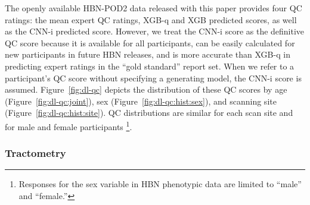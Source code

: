 \documentclass[fleqn,10pt,inline]{wlscirep}
\begin{document}
The openly available HBN-POD2 data released with this paper provides four QC ratings: the mean expert QC ratings, XGB-q and
XGB predicted scores, as well as the CNN-i predicted score. However, we treat the CNN-i
score as the definitive QC score because it is available for all participants,
can be easily calculated for new participants in future HBN releases, and is more
accurate than XGB-q in predicting expert ratings in the ``gold standard'' report set. When we refer to a participant's QC score without
specifying a generating model, the CNN-i score is assumed.
Figure~\ref{fig:dl-qc} depicts the distribution of these QC scores by age
(Figure~\ref{fig:dl-qc:joint}), sex (Figure~\ref{fig:dl-qc:hist:sex}), and scanning site
(Figure~\ref{fig:dl-qc:hist:site}). QC distributions are similar for each scan site
and for male and female participants \footnote{%
    Responses for the sex variable in HBN phenotypic data are limited to
    ``male'' and ``female.''
}.

\subsubsection*{Tractometry}
\end{document}
